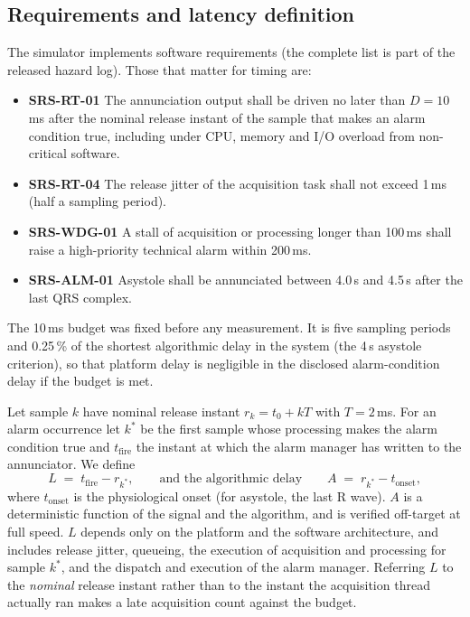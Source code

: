\documentclass[preprint,3p,10pt]{elsarticle}
\begin{document}
\subsection{Requirements and latency definition}
The simulator implements \NReq{} software requirements (the complete list is part of the released hazard log). Those that matter for timing are:
\begin{itemize}
\item \textbf{SRS-RT-01} The annunciation output shall be driven no later than $D=10$\,ms after the nominal release instant of the sample that makes an alarm condition true, including under CPU, memory and I/O overload from non-critical software.
\item \textbf{SRS-RT-04} The release jitter of the acquisition task shall not exceed 1\,ms (half a sampling period).
\item \textbf{SRS-WDG-01} A stall of acquisition or processing longer than 100\,ms shall raise a high-priority technical alarm within 200\,ms.
\item \textbf{SRS-ALM-01} Asystole shall be annunciated between 4.0\,s and 4.5\,s after the last QRS complex.
\end{itemize}
The 10\,ms budget was fixed before any measurement. It is five sampling periods and 0.25\,\% of the shortest algorithmic delay in the system (the 4\,s asystole criterion), so that platform delay is negligible in the disclosed alarm-condition delay if the budget is met.

Let sample $k$ have nominal release instant $r_k=t_0+kT$ with $T=2$\,ms. For an alarm occurrence let $k^\ast$ be the first sample whose processing makes the alarm condition true and $t_{\mathrm{fire}}$ the instant at which the alarm manager has written to the annunciator. We define
\begin{equation}
L \;=\; t_{\mathrm{fire}} - r_{k^\ast}, \qquad\text{and the algorithmic delay}\qquad A \;=\; r_{k^\ast}-t_{\mathrm{onset}},
\end{equation}
where $t_{\mathrm{onset}}$ is the physiological onset (for asystole, the last R wave). $A$ is a deterministic function of the signal and the algorithm, and is verified off-target at full speed. $L$ depends only on the platform and the software architecture, and includes release jitter, queueing, the execution of acquisition and processing for sample $k^\ast$, and the dispatch and execution of the alarm manager. Referring $L$ to the \emph{nominal} release instant rather than to the instant the acquisition thread actually ran makes a late acquisition count against the budget.
\end{document}
